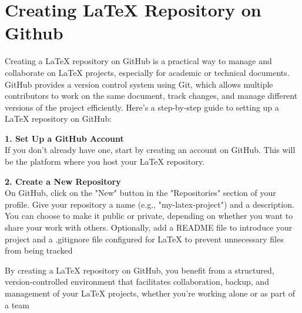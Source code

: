 \documentclass[12pt, a4paper]{article}
\begin{document}
\newpage


\centering
\section*{Creating LaTeX Repository on Github}
\vspace{2cm}
Creating a LaTeX repository on GitHub is a practical way to manage and collaborate on LaTeX projects, especially for academic or technical documents. GitHub provides a version control system using Git, which allows multiple contributors to work on the same document, track changes, and manage different versions of the project efficiently. Here’s a step-by-step guide to setting up a LaTeX repository on GitHub:\\

\vspace{2cm}

\textbf{1. Set Up a GitHub Account}\\
\vspace{0.5cm}
If you don’t already have one, start by creating an account on GitHub. This will be the platform where you host your LaTeX repository. \\

\vspace{2cm}

\textbf{2. Create a New Repository}\\
\vspace{0.5cm}
On GitHub, click on the "New" button in the "Repositories" section of your profile. Give your repository a name (e.g., "my-latex-project") and a description. You can choose to make it public or private, depending on whether you want to share your work with others. Optionally, add a README file to introduce your project and a .gitignore file configured for LaTeX to prevent unnecessary files from being tracked \\

\vspace{2cm}

By creating a LaTeX repository on GitHub, you benefit from a structured, version-controlled environment that facilitates collaboration, backup, and management of your LaTeX projects, whether you're working alone or as part of a team
\end{document}
